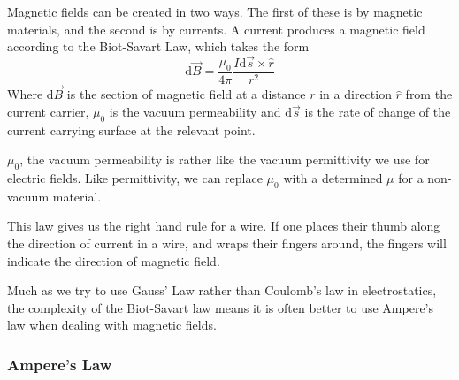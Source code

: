 \documentclass[12pt]{report}
\begin{document}
\begin{flushleft}
Magnetic fields can be created in two ways. The first of these is by magnetic
materials, and the second is by currents. A current produces a magnetic field
according to the Biot-Savart Law, which takes the form
\[\mathrm{d}\vec{B} 
= \frac{\mu_0}{4\pi}\frac{I\mathrm{d}\vec{s}\times\hat{r}}{r^2}\]
Where \(\mathrm{d}\vec{B}\) is the section of magnetic field at a distance
\(r\) in a direction \(\hat{r}\) from the current carrier, \(\mu_0\) is the
vacuum permeability and \(\mathrm{d}\vec{s}\) is the rate of change of the
current carrying surface at the relevant point. \par
\(\mu_0\), the vacuum permeability is rather like the vacuum permittivity we
use for electric fields. Like permittivity, we can replace \(\mu_0\) with a
determined \(\mu\) for a non-vacuum material. \par
This law gives us the right hand rule for a wire. If one places their thumb
along the direction of current in a wire, and wraps their fingers around, the
fingers will indicate the direction of magnetic field. \par
Much as we try to use Gauss' Law rather than Coulomb's law in electrostatics,
the complexity of the Biot-Savart law means it is often better to use Ampere's
law when dealing with magnetic fields.

\subsubsection*{Ampere's Law}


\end{flushleft}
\end{document}
